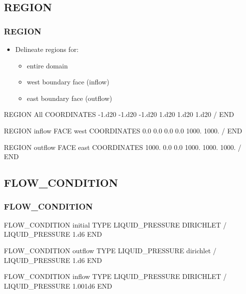 \documentclass{beamer}
\begin{document}
\subsection{REGION}

\begin{frame}\frametitle{REGION}

\begin{itemize}
  \item Delineate regions for:
  \begin{itemize}
    \item entire domain
    \item west boundary face (inflow)
    \item east boundary face (outflow)
  \end{itemize}
\end{itemize}

\begin{semiverbatim}


REGION All
  COORDINATES
    -1.d20 -1.d20 -1.d20
    1.d20 1.d20 1.d20
  /
END




REGION inflow
  FACE west
  COORDINATES
    0.0  0.0   0.0
    0.0  1000. 1000.
  /
END

REGION outflow
  FACE east
  COORDINATES
    1000. 0.0   0.0
    1000. 1000. 1000.
  /
END

\end{semiverbatim}

\end{frame}

\subsection{FLOW\_CONDITION}

\begin{frame}\frametitle{FLOW\_CONDITION}

	\begin{semiverbatim}
FLOW_CONDITION initial
  TYPE
    LIQUID_PRESSURE DIRICHLET
  /
  LIQUID_PRESSURE 1.d6
END

FLOW_CONDITION outflow
  TYPE
    LIQUID_PRESSURE dirichlet
  /
  LIQUID_PRESSURE 1.d6
END



FLOW_CONDITION inflow
  TYPE
    LIQUID_PRESSURE DIRICHLET
  /
  LIQUID_PRESSURE 1.001d6
END
	\end{semiverbatim}
	
\end{frame}
\end{document}
